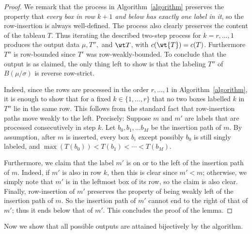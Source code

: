 \begin{proof}
We remark that the process in Algorithm~\ref{algorithm} preserves the property that \emph{every box in row $k+1$ and below has exactly one label in it}, so the row-insertion is always well-defined. The process also clearly preserves the content of the tableau $T$. Thus iterating the described two-step process for $k=r,\ldots,1$ produces the output data $\mu, T'',$ and $\wt T$, with $c(\wt{T}) = c(T)$. Furthermore $T''$ is row-bounded since $T'$ was row-weakly-bounded. To conclude that the output is as claimed, the only thing left to show is that the labeling $T''$ of $B(\mu/\sigma)$ is reverse row-strict.

 Indeed, since the rows are processed in the order $r,\ldots,1$ in Algorithm~\ref{algorithm}, it is enough to show that for a fixed $k\in\{1,\ldots,r\}$ that no two boxes labelled $k$ in $T''$ lie in the same row. This follows from the standard fact that row-insertion paths move weakly to the left. Precisely: Suppose $m$ and $m'$ are labels that are processed consecutively in step $k$. Let $b_0,b_1,\ldots b_M$ be the insertion path of $m$. By assumption, after $m$ is inserted, every box $b_i$ except possibly $b_0$ is still singly labeled, and $\max(T(b_0)) < T(b_1) < \cdots < T(b_M)$. 

Furthermore, we claim that the label $m'$ is on or to the left of the insertion path of $m$. Indeed, if $m'$ is also in row $k$, then this is clear since $m'<m$; otherwise, we simply note that $m'$ is in the leftmost box of its row, so the claim is also clear. Finally, row-insertion of $m'$ preserves the property of being weakly left of the insertion path of $m$. So the insertion path of $m'$ cannot end to the right of that of $m'$; thus it ends below that of $m'$. This concludes the proof of the lemma.
\end{proof}

Now we show that all possible outputs are attained bijectively by the algorithm.

